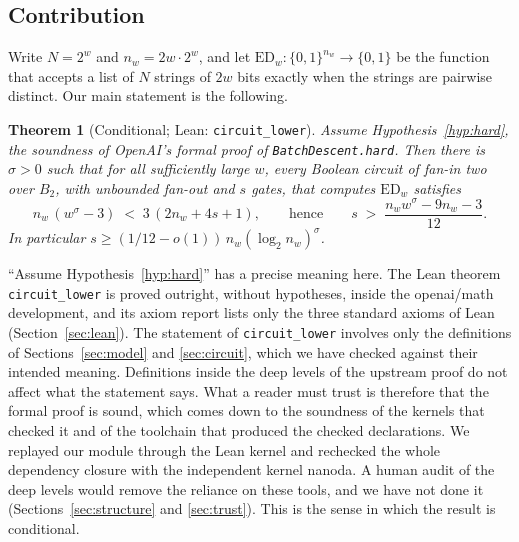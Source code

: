 \documentclass[11pt]{amsart}
\newtheorem{theorem}{Theorem}[section]
\theoremstyle{definition}
\theoremstyle{remark}
\newcommand{\ED}{\mathrm{ED}}
\newcommand{\lean}[1]{\texttt{#1}}
\begin{document}
\subsection{Contribution}
Write $N=2^w$ and $n_w=2w\cdot 2^w$, and let $\ED_w\colon\{0,1\}^{n_w}\to\{0,1\}$ be the function that accepts a list of $N$ strings of $2w$ bits exactly when the strings are pairwise distinct. Our main statement is the following.

\begin{theorem}[Conditional; Lean: \lean{circuit\_lower}]\label{thm:main}
Assume Hypothesis~\ref{hyp:hard}, the soundness of OpenAI's formal proof of \lean{BatchDescent.hard}. Then there is $\sigma>0$ such that for all sufficiently large $w$, every Boolean circuit of fan-in two over $B_2$, with unbounded fan-out and $s$ gates, that computes $\ED_w$ satisfies
\[
 n_w\,(w^{\sigma}-3) \;<\; 3\,(2n_w+4s+1),
 \qquad\text{hence}\qquad
 s \;>\; \frac{n_w w^{\sigma}-9n_w-3}{12}.
\]
In particular $s\ge(1/12-o(1))\,n_w(\log_2 n_w)^{\sigma}$.
\end{theorem}

``Assume Hypothesis~\ref{hyp:hard}'' has a precise meaning here. The Lean theorem \lean{circuit\_lower} is proved outright, without hypotheses, inside the openai/math development, and its axiom report lists only the three standard axioms of Lean (Section~\ref{sec:lean}). The statement of \lean{circuit\_lower} involves only the definitions of Sections~\ref{sec:model} and \ref{sec:circuit}, which we have checked against their intended meaning. Definitions inside the deep levels of the upstream proof do not affect what the statement says. What a reader must trust is therefore that the formal proof is sound, which comes down to the soundness of the kernels that checked it and of the toolchain that produced the checked declarations. We replayed our module through the Lean kernel and rechecked the whole dependency closure with the independent kernel nanoda. A human audit of the deep levels would remove the reliance on these tools, and we have not done it (Sections~\ref{sec:structure} and \ref{sec:trust}). This is the sense in which the result is conditional.
\end{document}
